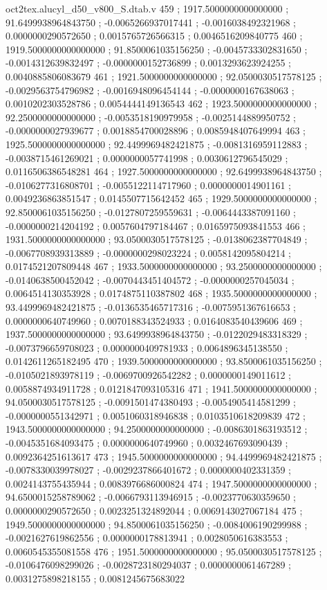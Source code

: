 \begin{filecontents}[overwrite]{oct2tex.alucyl_d50_v800_S.dtab.v}
459 ; 1917.5000000000000000 ; 91.6499938964843750 ; -0.0065266937017441 ; -0.0016038492321968 ; 0.0000000290572650 ; 0.0015765726566315 ; 0.0046516209840775
460 ; 1919.5000000000000000 ; 91.8500061035156250 ; -0.0045733302831650 ; -0.0014312639832497 ; -0.0000000152736899 ; 0.0013293623924255 ; 0.0040885806083679
461 ; 1921.5000000000000000 ; 92.0500030517578125 ; -0.0029563754796982 ; -0.0016948096454144 ; -0.0000000167638063 ; 0.0010202303528786 ; 0.0054444149136543
462 ; 1923.5000000000000000 ; 92.2500000000000000 ; -0.0053518190979958 ; -0.0025144889950752 ; -0.0000000027939677 ; 0.0018854700028896 ; 0.0085948407649994
463 ; 1925.5000000000000000 ; 92.4499969482421875 ; -0.0081316959112883 ; -0.0038715461269021 ; 0.0000000057741998 ; 0.0030612796545029 ; 0.0116506386548281
464 ; 1927.5000000000000000 ; 92.6499938964843750 ; -0.0106277316808701 ; -0.0055122114717960 ; 0.0000000014901161 ; 0.0049236863851547 ; 0.0145507715642452
465 ; 1929.5000000000000000 ; 92.8500061035156250 ; -0.0127807259559631 ; -0.0064443387091160 ; -0.0000000214204192 ; 0.0057604797184467 ; 0.0165975093841553
466 ; 1931.5000000000000000 ; 93.0500030517578125 ; -0.0138062387704849 ; -0.0067708939313889 ; -0.0000000298023224 ; 0.0058142095804214 ; 0.0174521207809448
467 ; 1933.5000000000000000 ; 93.2500000000000000 ; -0.0140638500452042 ; -0.0070443451404572 ; -0.0000000257045034 ; 0.0064514130353928 ; 0.0174875110387802
468 ; 1935.5000000000000000 ; 93.4499969482421875 ; -0.0136535465717316 ; -0.0075951367616653 ; 0.0000000640749960 ; 0.0070188343524933 ; 0.0164083540439606
469 ; 1937.5000000000000000 ; 93.6499938964843750 ; -0.0122029483318329 ; -0.0073796659708023 ; 0.0000000409781933 ; 0.0064896345138550 ; 0.0142611265182495
470 ; 1939.5000000000000000 ; 93.8500061035156250 ; -0.0105021893978119 ; -0.0069700926542282 ; 0.0000000149011612 ; 0.0058874934911728 ; 0.0121847093105316
471 ; 1941.5000000000000000 ; 94.0500030517578125 ; -0.0091501474380493 ; -0.0054905414581299 ; -0.0000000551342971 ; 0.0051060318946838 ; 0.0103510618209839
472 ; 1943.5000000000000000 ; 94.2500000000000000 ; -0.0086301863193512 ; -0.0045351684093475 ; 0.0000000640749960 ; 0.0032467693090439 ; 0.0092364251613617
473 ; 1945.5000000000000000 ; 94.4499969482421875 ; -0.0078330039978027 ; -0.0029237866401672 ; 0.0000000402331359 ; 0.0024143755435944 ; 0.0083976686000824
474 ; 1947.5000000000000000 ; 94.6500015258789062 ; -0.0066793113946915 ; -0.0023770630359650 ; 0.0000000290572650 ; 0.0023251324892044 ; 0.0069143027067184
475 ; 1949.5000000000000000 ; 94.8500061035156250 ; -0.0084006190299988 ; -0.0021627619862556 ; 0.0000000178813941 ; 0.0028050616383553 ; 0.0060545355081558
476 ; 1951.5000000000000000 ; 95.0500030517578125 ; -0.0106476098299026 ; -0.0028723180294037 ; 0.0000000061467289 ; 0.0031275898218155 ; 0.0081245675683022
\end{filecontents}
